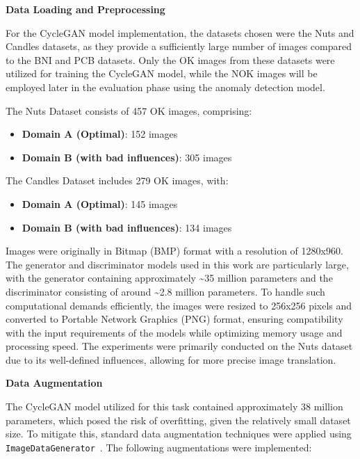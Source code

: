 \documentclass[12pt,DIV14,BCOR12mm,a4paper,footinclude=false,headinclude,parskip=half-,twoside,openright,cleardoublepage=empty,toc=index,bibliography=totoc,listof=totoc]{scrreprt}
\numberwithin{equation}{chapter}
\begin{document}
\textbf{Data Loading and Preprocessing}

For the CycleGAN model implementation, the datasets chosen were the Nuts and Candles datasets, as they provide a sufficiently large number of images compared to the BNI and PCB datasets. Only the OK images from these datasets were utilized for training the CycleGAN model, while the NOK images will be employed later in the evaluation phase using the anomaly detection model.

The Nuts Dataset consists of 457 OK images, comprising:
\begin{itemize}
    \item \textbf{Domain A (Optimal)}: 152 images
    \item \textbf{Domain B (with bad influences)}: 305 images
\end{itemize}

The Candles Dataset includes 279 OK images, with:
\begin{itemize}
    \item \textbf{Domain A (Optimal)}: 145 images
    \item \textbf{Domain B (with bad influences)}: 134 images
\end{itemize}

Images were originally in Bitmap (BMP) format with a resolution of 1280x960. The generator and discriminator models used in this work are particularly large, with the generator containing approximately \textasciitilde 35 million parameters and the discriminator consisting of around \textasciitilde 2.8 million parameters. To handle such computational demands efficiently, the images were resized to 256x256 pixels and converted to Portable Network Graphics (PNG) format, ensuring compatibility with the input requirements of the models while optimizing memory usage and processing speed. The experiments were primarily conducted on the Nuts dataset due to its well-defined influences, allowing for more precise image translation.

\textbf{Data Augmentation}

The CycleGAN model utilized for this task contained approximately 38 million parameters, which posed the risk of overfitting, given the relatively small dataset size. To mitigate this, standard data augmentation techniques were applied using \texttt{ImageDataGenerator}~\cite{tensorflow_imagedatagenerator}. The following augmentations were implemented:
\end{document}
